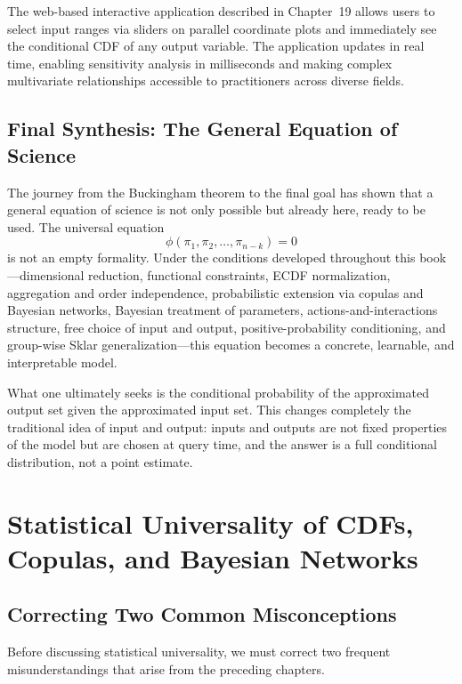 The web-based interactive application described in Chapter~19 allows users to select input ranges via sliders on parallel coordinate plots and immediately see the conditional CDF of any output variable. The application updates in real time, enabling sensitivity analysis in milliseconds and making complex multivariate relationships accessible to practitioners across diverse fields.

\subsection{Final Synthesis: The General Equation of Science}

The journey from the Buckingham theorem to the final goal has shown that a general equation of science is not only possible but already here, ready to be used. The universal equation
\[
\phi(\pi_1,\pi_2,\dots,\pi_{n-k}) = 0
\]
is not an empty formality. Under the conditions developed throughout this book—dimensional reduction, functional constraints, ECDF normalization, aggregation and order independence, probabilistic extension via copulas and Bayesian networks, Bayesian treatment of parameters, actions-and-interactions structure, free choice of input and output, positive-probability conditioning, and group-wise Sklar generalization—this equation becomes a concrete, learnable, and interpretable model.

What one ultimately seeks is the conditional probability of the approximated output set given the approximated input set. This changes completely the traditional idea of input and output: inputs and outputs are not fixed properties of the model but are chosen at query time, and the answer is a full conditional distribution, not a point estimate.

\section{Statistical Universality of CDFs, Copulas, and Bayesian Networks}
\label{subsec:universality-clarified}

\subsection{Correcting Two Common Misconceptions}

Before discussing statistical universality, we must correct two frequent misunderstandings that arise from the preceding chapters.

